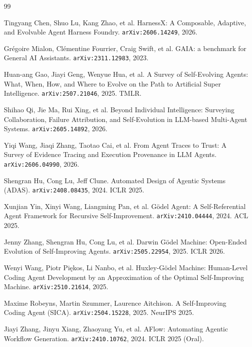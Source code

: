 \begin{thebibliography}{99}

 Tingyang Chen, Shuo Lu, Kang Zhao, et al. HarnessX: A
  Composable, Adaptive, and Evolvable Agent Harness Foundry.
  \texttt{arXiv:2606.14249}, 2026.

 Gr\'{e}goire Mialon, Cl\'{e}mentine Fourrier, Craig Swift,
  et al. GAIA: a benchmark for General AI Assistants.
  \texttt{arXiv:2311.12983}, 2023.

 Huan-ang Gao, Jiayi Geng, Wenyue Hua, et al.
  A Survey of Self-Evolving Agents: What, When, How, and Where to Evolve
  on the Path to Artificial Super Intelligence. \texttt{arXiv:2507.21046},
  2025. TMLR.

 Shihao Qi, Jie Ma, Rui Xing, et al. Beyond
  Individual Intelligence: Surveying Collaboration, Failure Attribution,
  and Self-Evolution in LLM-based Multi-Agent Systems.
  \texttt{arXiv:2605.14892}, 2026.

 Yiqi Wang, Jiaqi Zhang, Taotao Cai, et al.
  From Agent Traces to Trust: A Survey of Evidence Tracing and Execution
  Provenance in LLM Agents. \texttt{arXiv:2606.04990}, 2026.

 Shengran Hu, Cong Lu, Jeff Clune. Automated Design of
  Agentic Systems (ADAS). \texttt{arXiv:2408.08435}, 2024. ICLR 2025.

 Xunjian Yin, Xinyi Wang, Liangming Pan, et al.
  G\"odel Agent: A Self-Referential Agent Framework for Recursive
  Self-Improvement. \texttt{arXiv:2410.04444}, 2024. ACL 2025.

 Jenny Zhang, Shengran Hu, Cong Lu, et al. Darwin G\"odel
  Machine: Open-Ended Evolution of Self-Improving Agents.
  \texttt{arXiv:2505.22954}, 2025. ICLR 2026.

 Wenyi Wang, Piotr Pi\k{e}kos, Li Nanbo, et al. Huxley-G\"odel
  Machine: Human-Level Coding Agent Development by an Approximation of the
  Optimal Self-Improving Machine. \texttt{arXiv:2510.21614}, 2025.

 Maxime Robeyns, Martin Szummer, Laurence Aitchison. A
  Self-Improving Coding Agent (SICA). \texttt{arXiv:2504.15228}, 2025.
  NeurIPS 2025.

 Jiayi Zhang, Jinyu Xiang, Zhaoyang Yu, et al. AFlow:
  Automating Agentic Workflow Generation. \texttt{arXiv:2410.10762}, 2024.
  ICLR 2025 (Oral).


\end{thebibliography}
